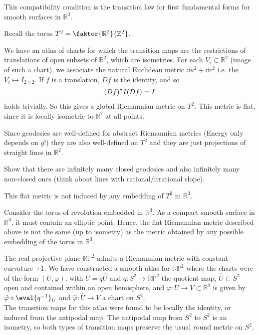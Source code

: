 This compatibility condition is the transition law for first fundamental forms for smooth surfaces in $\mathbb R^3$.

\begin{example}[Torus]
	Recall the torus $T^2 = \faktor{\mathbb R^2}{\mathbb Z^2}$.
	\begin{center}
	\end{center}
	We have an atlas of charts for which the transition maps are the restrictions of translations of open subsets of $\mathbb R^2$, which are isometries.
	For each $V_i \subset \mathbb R^2$ (image of such a chart), we associate the natural Euclidean metric $\dd{u}^2 + \dd{v}^2$ i.e. the $V_i \mapsto I_{2 \times 2}$.
	If $f$ is a translation, $Df$ is the identity, and so
	\begin{align*}
		(Df)^\intercal I (Df) = I
	\end{align*}
	holds trivially.
	So this gives a global Riemannian metric on $T^2$.
	This metric is flat, since it is locally isometric to $\mathbb R^2$ at all points.

	Since geodesics are well-defined for abstract Riemannian metrics (Energy only depends on $g$!) they are also well-defined on $T^2$ and they are just projections of straight lines in $\mathbb{R}^2$. 
\end{example}

\begin{exercise}
	Show that there are infinitely many closed geodesics and also infinitely many non-closed ones (think about lines with rational/irrational slope).
\end{exercise} 

\begin{note}
	This flat metric is not induced by any embedding of $T^2$ in $\mathbb{R}^3$.

	Consider the torus of revolution embedded in $\mathbb R^3$.
	As a compact smooth surface in $\mathbb R^3$, it must contain an elliptic point.
	Hence, the flat Riemannian metric described above is not the same (up to isometry) as the metric obtained by any possible embedding of the torus in $\mathbb R^3$.
\end{note} 

\begin{example}
	The real projective plane $\mathbb R \mathbb P^2$ admits a Riemannian metric with constant curvature $+1$.
	We have constructed a smooth atlas for $\mathbb R \mathbb P^2$ where the charts were of the form $(U, \varphi)$, with $U = q \hat U$ and $q \colon S^2 \to \mathbb R \mathbb P^2$ the quotient map, $\hat U \subset S^2$ open and contained within an open hemisphere, and $\varphi \colon U \to V \subset \mathbb R^2$ is given by $\hat \varphi \circ \eval{q^{-1}}_U$ and $\hat \varphi \colon \hat U \to V$ a chart on $S^2$. \\
	The transition maps for this atlas were found to be locally the identity, or induced from the antipodal map.
	The antipodal map from $S^2$ to $S^2$ is an isometry, so both types of transition maps preserve the usual round metric on $S^2$.
\end{example} 

